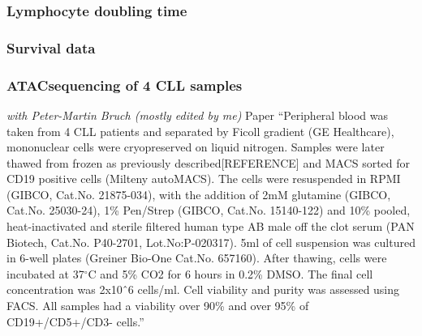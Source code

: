 \documentclass[11pt, a4paper, twosided]{book}
\begin{document}
\hypertarget{lymphocyte-doubling-time}{%
\subsubsection{Lymphocyte doubling time}\label{lymphocyte-doubling-time}}

\hypertarget{survival-data}{%
\subsubsection{Survival data}\label{survival-data}}

\hypertarget{atacsequencing-of-4-cll-samples}{%
\subsubsection{ATACsequencing of 4 CLL samples}\label{atacsequencing-of-4-cll-samples}}

\emph{with Peter-Martin Bruch (mostly edited by me)} Paper
``Peripheral blood was taken from 4 CLL patients and separated by Ficoll gradient (GE Healthcare), mononuclear cells were cryopreserved on liquid nitrogen. Samples were later thawed from frozen as previously described{[}REFERENCE{]} and MACS sorted for CD19 positive cells (Milteny autoMACS). The cells were resuspended in RPMI (GIBCO, Cat.No. 21875-034), with the addition of 2mM glutamine (GIBCO, Cat.No. 25030-24), 1\% Pen/Strep (GIBCO, Cat.No. 15140-122) and 10\% pooled, heat-inactivated and sterile filtered human type AB male off the clot serum (PAN Biotech, Cat.No. P40-2701, Lot.No:P-020317). 5ml of cell suspension was cultured in 6-well plates (Greiner Bio-One Cat.No. 657160). After thawing, cells were incubated at 37\(^\circ\)C and 5\% CO2 for 6 hours in 0.2\% DMSO. The final cell concentration was 2x10ˆ6 cells/ml. Cell viability and purity was assessed using FACS. All samples had a viability over 90\% and over 95\% of CD19+/CD5+/CD3- cells.''
\end{document}

